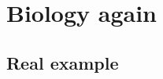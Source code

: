 \section{Biology again}
\label{sec:biology-again}
\subsection{Real example}
\label{subsec:}
\begin{frame}{\insertsubsection}

\end{frame}
%
%